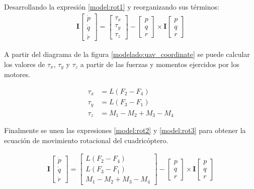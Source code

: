 Desarrollando la expresión \ref{model:rot1} y reorganizando sus términos:
\begin{align}
\mathbf{I}\begin{bmatrix}
	\dot{p}\\
	\dot{q}\\
	\dot{r}
\end{bmatrix}=
\begin{bmatrix}
	\tau_x\\
	\tau_y\\
	\tau_z
\end{bmatrix} -\begin{bmatrix}
	p\\
	q\\
	r
\end{bmatrix} \times\mathbf{I}\begin{bmatrix}
	p\\
	q\\
	r
\end{bmatrix}\label{model:rot2}
\end{align}

A partir del diagrama de la figura \ref{modelado:uav_coordinate} se puede calcular los valores de $\tau_x$, $\tau_y$ y $\tau_z$ a partir de las fuerzas y momentos ejercidos por los motores.

\begin{align}
	\tau_x &=  L (F_2-F_4)\nonumber\\
	\tau_y &=  L (F_3-F_1)\nonumber\\
	\tau_z &=  M_1 - M_2 + M_3 - M_4\label{model:rot3}
\end{align}

Finalmente se unen las expresiones \ref{model:rot2} y \ref{model:rot3} para obtener la ecuación de movimiento rotacional del cuadricóptero.






\begin{align}
	\mathbf{I}\begin{bmatrix}
		\dot{p}\\
		\dot{q}\\
		\dot{r}
	\end{bmatrix}=
	\begin{bmatrix}
		L (F_2-F_4)\\
		L (F_3-F_1)\\
		M_1 - M_2 + M_3 - M_4
	\end{bmatrix} -\begin{bmatrix}
		p\\
		q\\
		r
	\end{bmatrix} \times\mathbf{I}\begin{bmatrix}
		p\\
		q\\
		r
	\end{bmatrix}
\end{align}





